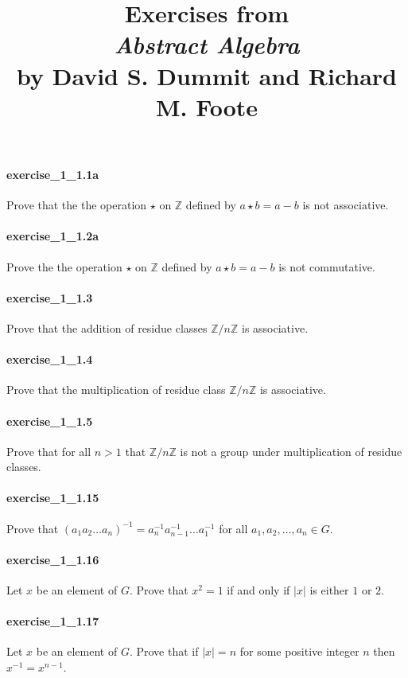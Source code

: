\documentclass{article}
\title{\textbf{
Exercises from \\
\textit{Abstract Algebra} \\
by David S. Dummit and Richard M. Foote
}}
\date{}
\begin{document}
\maketitle

\paragraph{exercise\_1\_1.1a} Prove that the the operation $\star$ on $\mathbb{Z}$ defined by $a \star b=a-b$ is not associative.

\paragraph{exercise\_1\_1.2a} Prove the the operation $\star$ on $\mathbb{Z}$ defined by $a\star b=a-b$ is not commutative.

\paragraph{exercise\_1\_1.3} Prove that the addition of residue classes $\mathbb{Z}/n\mathbb{Z}$ is associative.

\paragraph{exercise\_1\_1.4} Prove that the multiplication of residue class $\mathbb{Z}/n\mathbb{Z}$ is associative.

\paragraph{exercise\_1\_1.5} Prove that for all $n>1$ that $\mathbb{Z}/n\mathbb{Z}$ is not a group under multiplication of residue classes.

\paragraph{exercise\_1\_1.15} Prove that $(a_1a_2\dots a_n)^{-1} = a_n^{-1}a_{n-1}^{-1}\dots a_1^{-1}$ for all $a_1, a_2, \dots, a_n\in G$.

\paragraph{exercise\_1\_1.16} Let $x$ be an element of $G$. Prove that $x^2=1$ if and only if $|x|$ is either $1$ or $2$.

\paragraph{exercise\_1\_1.17} Let $x$ be an element of $G$. Prove that if $|x|=n$ for some positive integer $n$ then $x^{-1}=x^{n-1}$.
\end{document}
